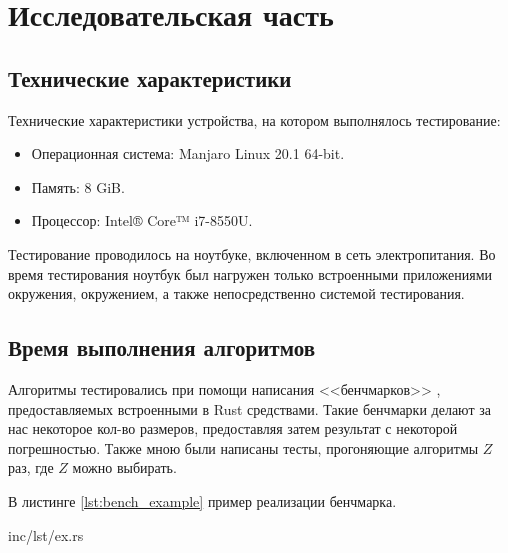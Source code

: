 \chapter{Исследовательская часть}




\section{Технические характеристики}

Технические характеристики устройства, на котором выполнялось тестирование:

\begin{itemize}
	\item Операционная система: Manjaro \cite{manjaro} Linux \cite{linux} 20.1 64-bit.
	\item Память: 8 GiB.
	\item Процессор: Intel® Core™ i7-8550U\cite{intel}.
\end{itemize}

Тестирование проводилось на ноутбуке, включенном в сеть электропитания. Во время тестирования ноутбук был нагружен только встроенными приложениями окружения, окружением, а также непосредственно системой тестирования.

\section{Время выполнения алгоритмов}

Алгоритмы тестировались при помощи написания <<бенчмарков>> \cite{rusttest}, предоставляемых встроенными в Rust средствами. Такие бенчмарки делают за нас некоторое кол-во размеров, предоставляя затем результат с некоторой погрешностью. Также мною были написаны тесты, прогоняющие алгоритмы $Z$ раз, где $Z$ можно выбирать.

В листинге \ref{lst:bench_example} пример реализации бенчмарка.

\begin{lstinputlisting}[
	caption={Пример бенчмарка},
	label={lst:bench_example},
	style={rust},
	]{inc/lst/ex.rs}
\end{lstinputlisting}

